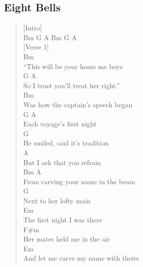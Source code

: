 \documentclass[11pt]{article}
\begin{document}
\subsection{Eight Bells}
\label{sec:org4db52dc}
\begin{verse}
[Intro]\\
\vspace*{1em}
Bm    G  A  Bm    G  A\\
\vspace*{1em}
\vspace*{1em}
[Verse 1]\\
\vspace*{1em}
\hspace*{1em}Bm\\
``This will be your home me boys\\
\hspace*{5em}G                      A\\
So I trust you'll treat her right.''\\
\hspace*{4em}Bm\\
Was how the captain's speech began\\
\hspace*{5em}G              A\\
Each voyage's first night\\
\hspace*{3em}G\\
He smiled, said it's tradition\\
\hspace*{6em}A\\
But I ask that you refrain\\
\hspace*{5em}Bm                A\\
From carving your name in the beam\\
\hspace*{5em}G\\
Next to her lofty main\\
\vspace*{1em}
\hspace*{4em}Em\\
The first night I was there\\
\hspace*{10em}F\#m\\
Her mates held me in the air\\
\hspace*{4em}Em\\
And let me carve my name with theirs\\

\end{verse}
\end{document}
